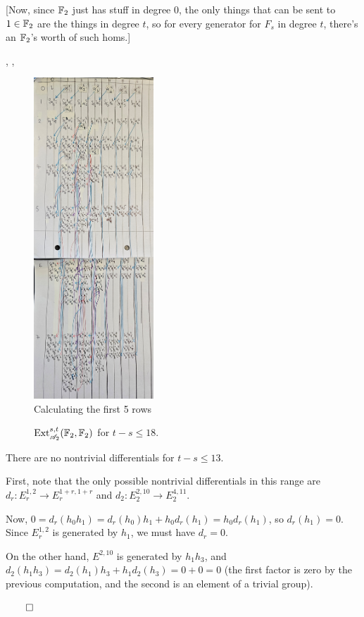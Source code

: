 \documentclass{MetricNotes2023}
\def\bb{\ensuremath\mathbb}
\def\A{\ensuremath{\mathscr{A}_2}}
\DeclareMathOperator{\Ext}{Ext}
\def\done{\begin{flushright}\vspace{-4.35ex}\(\qed\)\end{flushright}}
\begin{document}
[Now, since \(\bb{F}_2\) just has stuff in degree 0, the only things that can be sent to \(1 \in \bb{F}_2\) are the things in degree \(t\), so for every generator for \(F_s\) in degree \(t\), there's an \(\bb{F}_2\)'s worth of such homs.]

\autocite{ass}, \autocite{hatcher5}, \autocite{rognes2}

\begin{figure}[H]\label{2504041920}
\centering
\includegraphics[width=0.4\textwidth]{ext3}
\caption{Calculating the first 5 rows}
\end{figure}

\begin{figure}[H]
\centering

\caption[\(\Ext_{\A}^{s,t}(\bb{F}_2, \bb{F}_2)\) for \(t-s\leq 18\).]{\(\Ext_{\A}^{s,t}(\bb{F}_2, \bb{F}_2)\) for \(t-s\leq 18\).\protect\footnotemark}
\end{figure}

\begin{lemma}
There are no nontrivial differentials for \(t-s\leq 13\). 
\end{lemma}

\begin{ourproof}
First, note that the only possible nontrivial differentials in this range are \(d_r : E_r^{1,2} \to E_r^{1+r, 1+r}\) and \(d_2 : E_2^{2, 10} \to E_2^{4, 11}\). 

Now, \(0=d_r(h_0h_1)=d_r(h_0)h_1 + h_0d_r(h_1)=h_0d_r(h_1)\), so \(d_r(h_1)=0\). Since \(E_r^{1, 2}\) is generated by \(h_1\), we must have \(d_r=0\). 

On the other hand, \(E^{2, 10}\) is generated by \(h_1h_3\), and \(d_2(h_1h_3)=d_2(h_1)h_3+h_1d_2(h_3)=0+0=0\) (the first factor is zero by the previous computation, and the second is an element of a trivial group). \done
\end{ourproof}
\end{document}
